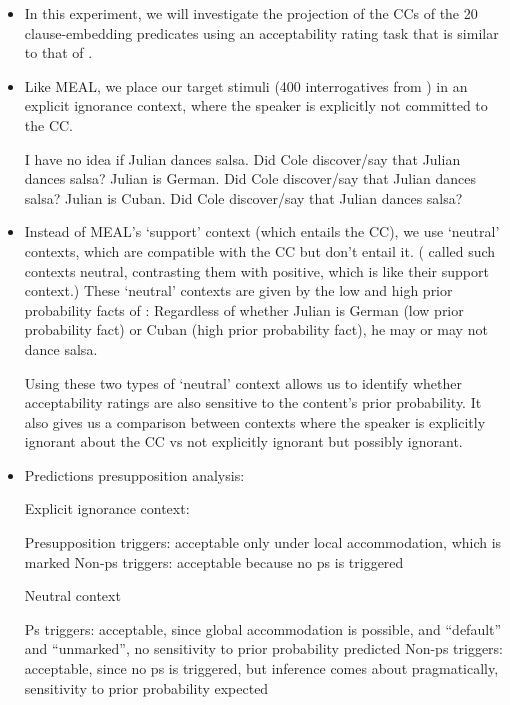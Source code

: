 \documentclass[11pt,fleqn]{article}
\newcommand{\6}{\mbox{$[\hspace*{-.6mm}[$}}
\newcommand{\9}{\mbox{$]\hspace*{-.6mm}]$}}
\begin{document}
\begin{itemize}

\item In this experiment, we will investigate the projection of the CCs of the 20 clause-embedding predicates using an acceptability rating task that is similar to that of \citealt{mandelkern-etal2020}. 

\item Like MEAL, we place our target stimuli (400 interrogatives from \citealt{degen-tonhauser-openmind, degen-tonhauser-language}) in an explicit ignorance context, where the speaker is explicitly not committed to the CC. 

\begin{exe}
\ex
\begin{xlist}
\ex I have no idea if Julian dances salsa. Did Cole discover/say that Julian dances salsa?
\ex Julian is German. Did Cole discover/say that Julian dances salsa?
\ex Julian is Cuban. Did Cole discover/say that Julian dances salsa?
\end{xlist}
\end{exe}

\item Instead of MEAL's `support' context (which entails the CC), we use `neutral' contexts, which are compatible with the CC but don't entail it. (\citealt{brst-lang11} called such contexts neutral, contrasting them with positive, which is like their support context.) These `neutral' contexts are given by the low and high prior probability facts of \citealt{degen-tonhauser-openmind}: Regardless of whether Julian is German (low prior probability fact) or Cuban (high prior probability fact), he may or may not dance salsa.

Using these two types of `neutral' context allows us to identify whether acceptability ratings are also sensitive to the content's prior probability. It also gives us a comparison between contexts where the speaker is explicitly ignorant about the CC vs not explicitly ignorant but possibly ignorant.

\item Predictions presupposition analysis:

\begin{exe}
\ex Explicit ignorance context:
\begin{xlist}
\ex Presupposition triggers: acceptable only under local accommodation, which is marked
\ex Non-ps triggers: acceptable because no ps is triggered
\end{xlist}
\ex Neutral context
\begin{xlist}
\ex Ps triggers: acceptable, since global accommodation is possible, and ``default'' and ``unmarked'', no sensitivity to prior probability predicted
\ex Non-ps triggers: acceptable, since no ps is triggered, but inference comes about pragmatically, sensitivity to prior probability expected
\end{xlist}
\end{exe}


\end{itemize}
\end{document}
